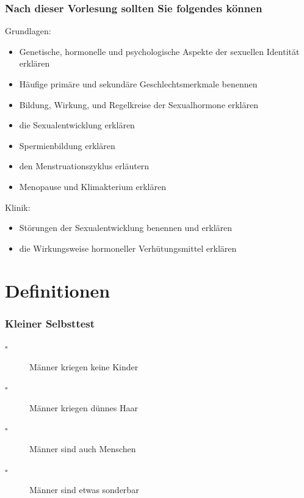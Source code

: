 \documentclass{beamer}
\begin{document}
\begin{frame}

 \frametitle{Nach dieser Vorlesung sollten Sie folgendes können}



\begin{block}{Grundlagen:}
\begin{itemize}
\item
 Genetische, hormonelle und psychologische Aspekte der sexuellen Identität erklären
\item
 Häufige primäre und sekundäre Geschlechtsmerkmale benennen
\item
 Bildung, Wirkung, und Regelkreise der Sexualhormone erklären
\item
 die Sexualentwicklung erklären
\item
 Spermienbildung erklären
\item
 den Menstruationszyklus erläutern
\item
Menopause und Klimakterium erklären



\end{itemize}

\end{block}

\begin{block}{Klinik:}
\begin{itemize}
\item
Störungen der Sexualentwicklung benennen und erklären

\item
die Wirkungsweise hormoneller Verhütungsmittel erklären


\end{itemize}

\end{block}


\end{frame}








\section{Definitionen}

\begin{frame}

\frametitle{Kleiner Selbsttest}


\begin{description}
\item[$\square$]
 Männer kriegen keine Kinder
\item[$\square$]
Männer kriegen dünnes Haar
\item[$\square$]
 Männer sind auch Menschen
\item[$\square$]
 Männer sind etwas sonderbar
\end{description}

$\,$

\end{frame}
\end{document}
